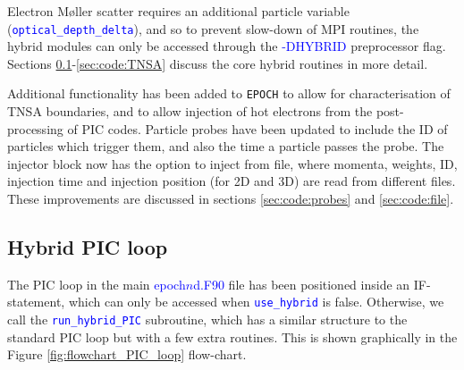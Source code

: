 \documentclass[12pt]{article}
\numberwithin{equation}{section}
\begin{document}
Electron M\o{}ller scatter requires an additional particle variable (\textcolor{blue}{\texttt{optical\_depth\_delta}}), and so to prevent slow-down of MPI routines, the hybrid modules can only be accessed through the \textcolor{blue}{-DHYBRID} preprocessor flag. Sections \ref{sec:code:PIC_loop}-\ref{sec:code:TNSA} discuss the core hybrid routines in more detail.

Additional functionality has been added to \texttt{EPOCH} to allow for characterisation of TNSA boundaries, and to allow injection of hot electrons from the post-processing of PIC codes. Particle probes have been updated to include the ID of particles which trigger them, and also the time a particle passes the probe. The injector block now has the option to inject from file, where momenta, weights, ID, injection time and injection position (for 2D and 3D) are read from different files. These improvements are discussed in sections \ref{sec:code:probes} and \ref{sec:code:file}.

\subsection{Hybrid PIC loop} \label{sec:code:PIC_loop}

The PIC loop in the main \textcolor{blue}{epoch$n$d.F90} file has been positioned inside an IF-statement, which can only be accessed when \textcolor{blue}{\texttt{use\_hybrid}} is false. Otherwise, we call the \texttt{\textcolor{blue}{run\_hybrid\_PIC}} subroutine, which has a similar structure to the standard PIC loop but with a few extra routines. This is shown graphically in the Figure \ref{fig:flowchart_PIC_loop} flow-chart.
\end{document}
